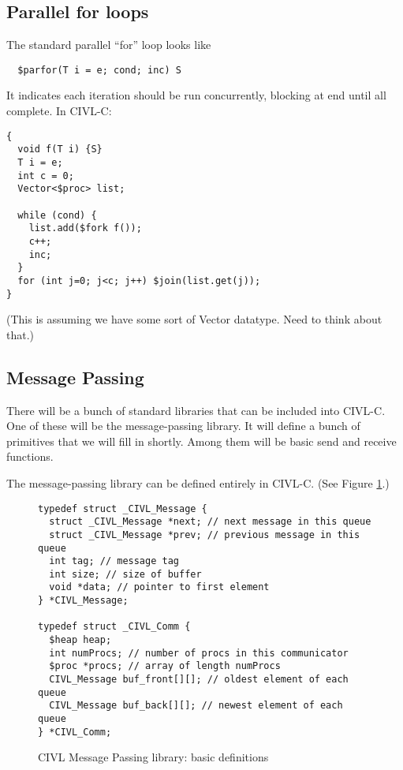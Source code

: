 \documentclass[11pt]{book}
\begin{document}
\subsection{Parallel for loops}
The standard parallel ``for'' loop looks like
\begin{verbatim}
  $parfor(T i = e; cond; inc) S
\end{verbatim}
It indicates each iteration should be run concurrently, blocking
at end until all complete.  In CIVL-C:

\begin{verbatim}
{
  void f(T i) {S}
  T i = e;
  int c = 0;
  Vector<$proc> list;

  while (cond) {
    list.add($fork f());
    c++;
    inc;
  }
  for (int j=0; j<c; j++) $join(list.get(j));
}
\end{verbatim}

(This is assuming we have some sort of Vector datatype.  Need to think
about that.)

\subsection{Message Passing}

There will be a bunch of standard libraries that can be included
into CIVL-C.  One of these will be the message-passing library.
It will define a bunch of primitives that we will fill in shortly.
Among them will be basic send and receive functions.

The message-passing library can be defined entirely in CIVL-C.
(See Figure \ref{fig:mp1}.)

\begin{figure}
\begin{verbatim}
typedef struct _CIVL_Message {
  struct _CIVL_Message *next; // next message in this queue
  struct _CIVL_Message *prev; // previous message in this queue
  int tag; // message tag
  int size; // size of buffer
  void *data; // pointer to first element
} *CIVL_Message;

typedef struct _CIVL_Comm {
  $heap heap;
  int numProcs; // number of procs in this communicator
  $proc *procs; // array of length numProcs
  CIVL_Message buf_front[][]; // oldest element of each queue
  CIVL_Message buf_back[][]; // newest element of each queue
} *CIVL_Comm;
\end{verbatim}
  \caption{CIVL Message Passing library: basic definitions}
  \label{fig:mp1}
\end{figure}
\end{document}
